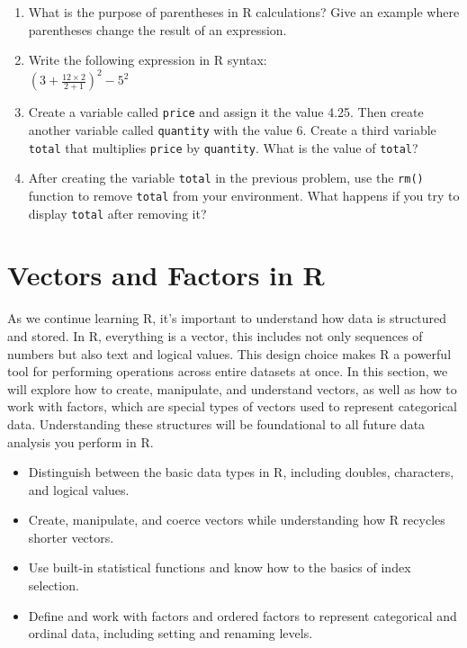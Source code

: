 \documentclass[
  letterpaper,
  DIV=11,
  numbers=noendperiod]{scrreprt}
\providecommand{\tightlist}{%
  \setlength{\itemsep}{0pt}\setlength{\parskip}{0pt}}
\begin{document}
\begin{enumerate}
\def\labelenumi{\arabic{enumi})}
\item
  What is the purpose of parentheses in R calculations? Give an example
  where parentheses change the result of an expression.
\item
  Write the following expression in R syntax:\\
  \(\left(3 + \frac{12\times 2}{2+1}\right)^2 - 5^2\)
\item
  Create a variable called \texttt{price} and assign it the value 4.25.
  Then create another variable called \texttt{quantity} with the value
  6. Create a third variable \texttt{total} that multiplies
  \texttt{price} by \texttt{quantity}. What is the value of
  \texttt{total}?
\item
  After creating the variable \texttt{total} in the previous problem,
  use the \texttt{rm()} function to remove \texttt{total} from your
  environment. What happens if you try to display \texttt{total} after
  removing it?
\end{enumerate}


\chapter{Vectors and Factors in R}\label{vectors-and-factors-in-r}

As we continue learning R, it's important to understand how data is
structured and stored. In R, everything is a vector, this includes not
only sequences of numbers but also text and logical values. This design
choice makes R a powerful tool for performing operations across entire
datasets at once. In this section, we will explore how to create,
manipulate, and understand vectors, as well as how to work with factors,
which are special types of vectors used to represent categorical data.
Understanding these structures will be foundational to all future data
analysis you perform in R.

\begin{itemize}
\tightlist
\item
  Distinguish between the basic data types in R, including doubles,
  characters, and logical values.
\item
  Create, manipulate, and coerce vectors while understanding how R
  recycles shorter vectors.
\item
  Use built-in statistical functions and know how to the basics of index
  selection.
\item
  Define and work with factors and ordered factors to represent
  categorical and ordinal data, including setting and renaming levels.
\end{itemize}
\end{document}
